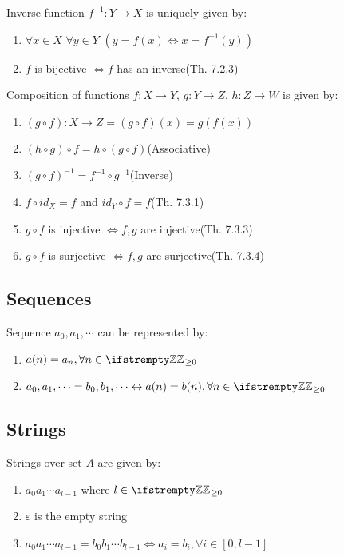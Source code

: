 \documentclass[12pt, a4paper]{article}
\begin{document}
\begin{multicols*}{3}
Inverse function $f^{-1}: Y\rightarrow X$ is uniquely given by:
\begin{enumerate}[\roman*.]
  \item $\forall x \in X$ $\forall y \in Y$ $(y=f(x)\iff x=f^{-1}(y))$ 
  \item $f$ is bijective $\iff f$ has an inverse\hfill(Th. 7.2.3) 
\end{enumerate}

Composition of functions $f:X\rightarrow Y$, $g:Y\rightarrow Z$, $h:Z\rightarrow W$ is given by:
\begin{enumerate}[\roman*.]
  \item $(g\circ f): X\rightarrow Z = (g \circ f)(x) = g(f(x))$
  \item $(h\circ g)\circ f = h\circ(g\circ f)$\hfill(Associative)
  \item $(g\circ f)^{-1} = f^{-1}\circ g^{-1}$\hfill(Inverse)
  \item $f\circ id_X = f$ and $id_Y \circ f = f$\hfill(Th. 7.3.1)
  \item $g\circ f$ is injective $\iff f,g$ are injective\hfill(Th. 7.3.3)
  \item $g\circ f$ is surjective $\iff f,g$ are surjective\hfill(Th. 7.3.4) 
\end{enumerate}
\colbreak

\subsection{Sequences}
Sequence $a_0, a_1,\cdots$ can be represented by:
\begin{enumerate}[\roman*.]
  \item $a(n)=a_n, \forall n \in \ZZ_{\geq 0}$
  \item $a_0, a_1,\cdots = b_0, b_1,\cdots \iff a(n)=b(n), \forall n \in \ZZ_{\geq 0}$
\end{enumerate}

\subsection{Strings}
Strings over set $A$ are given by:
\begin{enumerate}[\roman*.]
  \item $a_0a_1\cdots a_{l-1}$ where $l\in\ZZ_{\geq 0}$
  \item $\varepsilon$ is the empty string
  \item $a_0a_1\cdots a_{l-1} = b_0b_1\cdots b_{l-1} \iff a_i=b_i, \forall i \in [0, l-1]$
\end{enumerate}


\end{multicols*}
\end{document}
